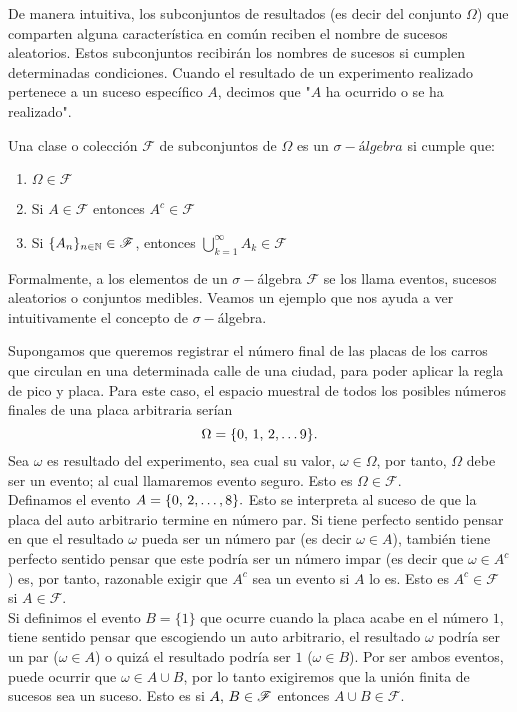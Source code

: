 De manera intuitiva, los subconjuntos de resultados (es decir del conjunto $\Omega$) que comparten alguna característica en común reciben el nombre de sucesos aleatorios.
Estos subconjuntos recibirán los nombres de sucesos si cumplen determinadas condiciones. Cuando el resultado de un experimento realizado pertenece a un suceso específico $A$, decimos que "$A$ ha ocurrido o se ha realizado".
\begin{Def}
    Una clase o colección $\mathscr{F}$ de subconjuntos de $\Omega$ es un $\sigma- \textit{álgebra}$ si cumple que:
    \begin{enumerate}
        \item $\Omega\in\mathscr{F}$
        \item Si $A\in\mathscr{F}$ entonces $A^c\in\mathscr{F}$
        \item Si $\{A_n\}_{n\in{\mathbb{N}}}\in\mathscr{F}$, entonces  $\bigcup_{k=1}^\infty A_k\in\mathscr{F}$
    \end{enumerate}
\end{Def}
 Formalmente, a los elementos de un $\sigma-$álgebra $\mathscr{F}$ se los llama eventos, sucesos aleatorios o conjuntos medibles.
 Veamos un ejemplo que nos ayuda a ver intuitivamente el concepto de $\sigma-$álgebra.
\begin{Ejm}
    Supongamos que queremos registrar el número final de las placas de los carros que circulan en una determinada calle de una ciudad, para poder aplicar la regla de pico y placa. Para este caso, el espacio muestral de todos los posibles números finales de una placa arbitraria serían 
    $$\Omega=\{0,\thinspace 1,\thinspace 2,\ldots 9\}.$$
    Sea $\omega$ es resultado del experimento, sea cual su valor, $\omega \in\Omega$, por tanto, $\Omega$ debe ser un evento; al cual llamaremos evento seguro. Esto es $\Omega\in\mathscr{F}.$\\ Definamos el evento $A=\{0,\thinspace 2,\ldots ,8\}.$ Esto se interpreta al suceso de que la placa del auto arbitrario termine en número par. Si tiene perfecto sentido pensar en que el resultado $\omega$ pueda ser un número par (es decir $\omega\in A$), también tiene perfecto sentido pensar que este podría ser un número impar (es decir que $\omega \in A^c$) es, por tanto, razonable exigir que $A^c$ sea un evento si $A$ lo es. Esto es $A^c\in\mathscr{F}$ si $A\in\mathscr{F}.$\\Si definimos el evento $B=\{1\}$ que ocurre cuando la placa acabe en el número $1$, tiene sentido pensar que escogiendo un auto arbitrario, el resultado $\omega$ podría ser un par ($\omega\in A$) o quizá el resultado podría ser $1$ ($\omega\in B$). Por ser ambos eventos, puede ocurrir que $\omega\in A\cup B$, por lo tanto exigiremos que la unión finita de sucesos sea un suceso. Esto es si $A,\thinspace B\in\mathscr{F}$ entonces $A\cup B\in \mathscr{F}.$
\end{Ejm}

